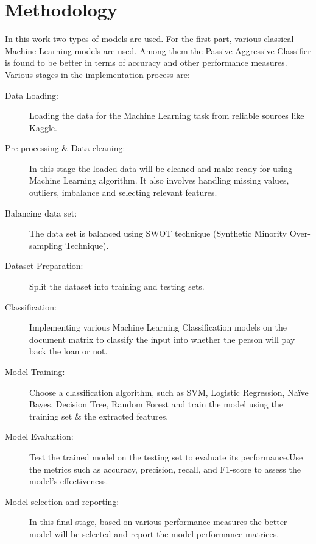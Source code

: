 \documentclass{josis}
\begin{document}
\section{Methodology}
  In this work two types of models are used. For the first part, various classical Machine Learning models are used. Among them the Passive Aggressive Classifier is found to be better in terms of accuracy and other performance measures. Various stages in the implementation process are:
\begin{description}
    \item[Data Loading:] Loading the data for the Machine Learning task from reliable sources like Kaggle.
    \item[Pre-processing \& Data cleaning:] In this stage the loaded data will be cleaned and make ready for using Machine Learning algorithm. It also involves handling missing values, outliers, imbalance and selecting relevant features.
    \item[Balancing data set:] The data set is balanced using SWOT technique (Synthetic Minority Over-sampling Technique).
    \item[Dataset Preparation:] Split the dataset into training and testing sets.
    \item[Classification:] Implementing various Machine Learning Classification models on the document matrix to classify the input into whether the person will pay back the loan or not.
    \item[Model Training:] Choose a classification algorithm, such as SVM, Logistic Regression, Naïve Bayes, Decision Tree, Random Forest and train the model using the training set \& the extracted features.
    \item[Model Evaluation:] Test the trained model on the testing set to evaluate its performance.Use the metrics such as accuracy, precision, recall, and F1-score to assess the model's effectiveness.
    \item[Model selection and reporting:] In this final stage, based on various performance measures the better model will be selected and report the model performance matrices.
\end{description} 
\end{document}

